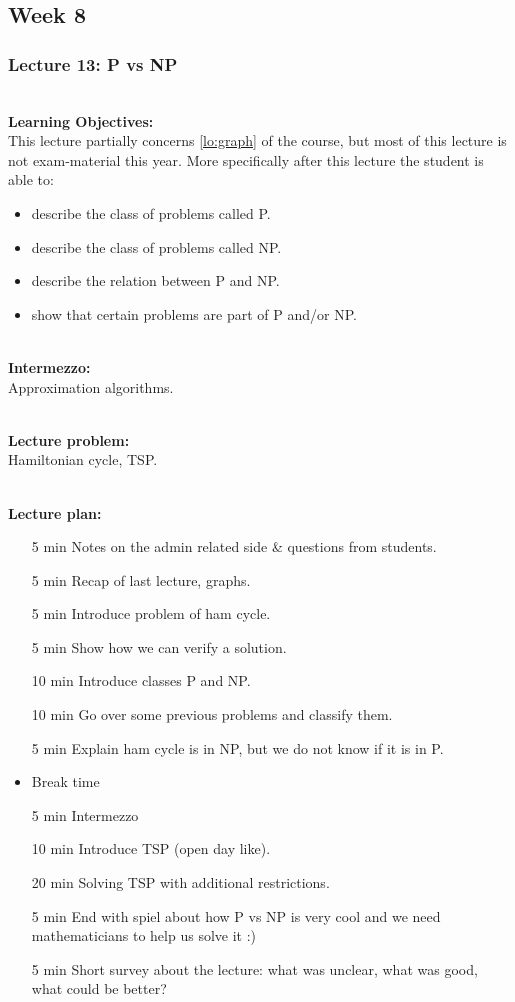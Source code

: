 \subsection{Week 8}
\label{sub:week_8}

\subsubsection{Lecture 13: P vs NP}
\label{sub:lecture_13}

\hfill\\
\textbf{Learning Objectives:}\\
This lecture partially concerns \cref{lo:graph} of the course, but most of this lecture is not exam-material this year.
More specifically after this lecture the student is able to:
\begin{itemize}
	\item describe the class of problems called P.
	\item describe the class of problems called NP.
	\item describe the relation between P and NP.
	\item show that certain problems are part of P and/or NP.
\end{itemize}

\hfill\\
\textbf{Intermezzo:}\\
Approximation algorithms.

\hfill\\
\textbf{Lecture problem:}\\
Hamiltonian cycle, TSP.

\hfill\\
\textbf{Lecture plan:}\\
\begin{itemize}
	\item[5 min] Notes on the admin related side \& questions from students.
	\item[5 min] Recap of last lecture, graphs.
	\item[5 min] Introduce problem of ham cycle.
	\item[5 min] Show how we can verify a solution.
	\item[10 min] Introduce classes P and NP.
	\item[10 min] Go over some previous problems and classify them.
	\item[5 min] Explain ham cycle is in NP, but we do not know if it is in P.
	\item Break time
	\item[5 min] Intermezzo
	\item[10 min] Introduce TSP (open day like).
	\item[20 min] Solving TSP with additional restrictions.
	\item[5 min] End with spiel about how P vs NP is very cool and we need mathematicians to help us solve it :)
	\item[5 min] Short survey about the lecture: what was unclear, what was good, what could be better?
\end{itemize}

